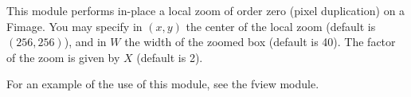 This module performs in-place a local zoom of order zero
(pixel duplication) on a Fimage.
You may specify in $(x,y)$ the center of the local zoom (default
is $(256,256)$), and in $W$ the width of the zoomed box (default is 40).
The factor of the zoom is given by $X$ (default is 2).

For an example of the use of this module, see the fview module.

